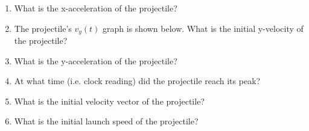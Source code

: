 \begin{description}
\begin{enumerate}

	\item What is the x-acceleration of the projectile?
	
	\item The projectile's $v_y(t)$ graph is shown below. What is the initial y-velocity of the projectile?

	
	\item What is the y-acceleration of the projectile?
	
	\item At what time (i.e. clock reading) did the projectile reach its peak?
	
	\item What is the initial velocity vector of the projectile?
	
	\item What is the initial launch speed of the projectile?
	
\end{enumerate}
\end{description}


%
%
%
%
%

